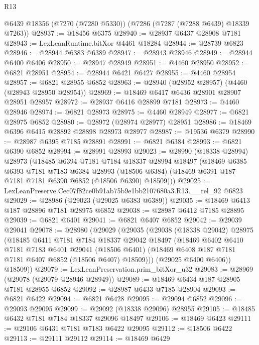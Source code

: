 \begin{lexlean}{R13}
\begin{coremodule}
    @6439
    @18356
    (@7270 (@7280 @5330))
    (@7286 (@7287 (@7288 @6439) @18339 @7263))
@28937 := @18456 @6375
@28940 := @28937 @6437 @28908 @7181
@28943 := LexLeanRuntime.bitXor @4461 @18284
@28944 := @28739 @6823
@28946 := @28944 @6383 @6389
@28947 := @28943 @28946
@28949 := @28944 @6400 @6406
@28950 := @28947 @28949
@28951 := @4460 @28950
@28952 := @6821 @28951
@28954 := @28944 @6421 @6427
@28955 := @4460 @28954
@28957 := @6821 @28955 @6852
@28963 := @28940 (@28952 @28957) (@4460 (@28943 @28950 @28954))
@28969 := @18469 @6417 @6436 @28901 @28907 @28951 @28957
@28972 := @28937 @6416 @28899 @7181
@28973 := @4460 @28946
@28974 := @6821 @28973
@28975 := @4460 @28949
@28977 := @6821 @28975 @6852
@28980 := @28972 (@28974 @28977) @28951
@28986 := @18469 @6396 @6415 @28892 @28898 @28973 @28977
@28987 := @19536 @6379
@28990 := @28987 @6395 @7185 @28891
@28991 := @6821 @6384
@28993 := @6821 @6390 @6852
@28994 := @28991 @28993
@29023 := @28990
    (@18338 @28994)
    @28973
    (@18485
      @6394
      @7181
      @7184
      @18337
      @28994
      @18497
      (@18469
        @6385
        @6393
        @7181
        @7183
        @6384
        @28993
        (@18506 @6384)
        (@18469 @6391 @187 @7181 @7181 @6390 @6852 (@18506 @6390) @18509)))
@29025 := LexLeanPreserve.Cec07f82ce0b91ab75b9e1bb2107680a3.R13.__rel_92 @6823
@29029 := @28986 (@29023 (@29025 @6383 @6389))
@29035 := @18469 @6413 @187 @28896 @7181 @28975 @6852
@29038 := @28987 @6412 @7185 @28895
@29039 := @6821 @6401
@29041 := @6821 @6407 @6852
@29042 := @29039 @29041
@29078 := @28980
    (@29029
      (@29035
        (@29038
          (@18338 @29042)
          @28975
          (@18485
            @6411
            @7181
            @7184
            @18337
            @29042
            @18497
            (@18469
              @6402
              @6410
              @7181
              @7183
              @6401
              @29041
              (@18506 @6401)
              (@18469 @6408 @187 @7181 @7181 @6407 @6852 (@18506 @6407) @18509)))
          (@29025 @6400 @6406))
        @18509))
@29079 := LexLeanPreservation.prim_bitXor_u32
@29083 := @28969 (@29078 (@29079 @28946 @28949))
@29089 := @18469 @6434 @187 @28905 @7181 @28955 @6852
@29092 := @28987 @6433 @7185 @28904
@29093 := @6821 @6422
@29094 := @6821 @6428
@29095 := @29094 @6852
@29096 := @29093 @29095
@29099 := @29092 (@18338 @29096) @28955
@29105 := @18485 @6432 @7181 @7184 @18337 @29096 @18497
@29106 := @18469 @6423
@29111 := @29106 @6431 @7181 @7183 @6422 @29095
@29112 := @18506 @6422
@29113 := @29111 @29112
@29114 := @18469 @6429

\end{coremodule}
\end{lexlean}
